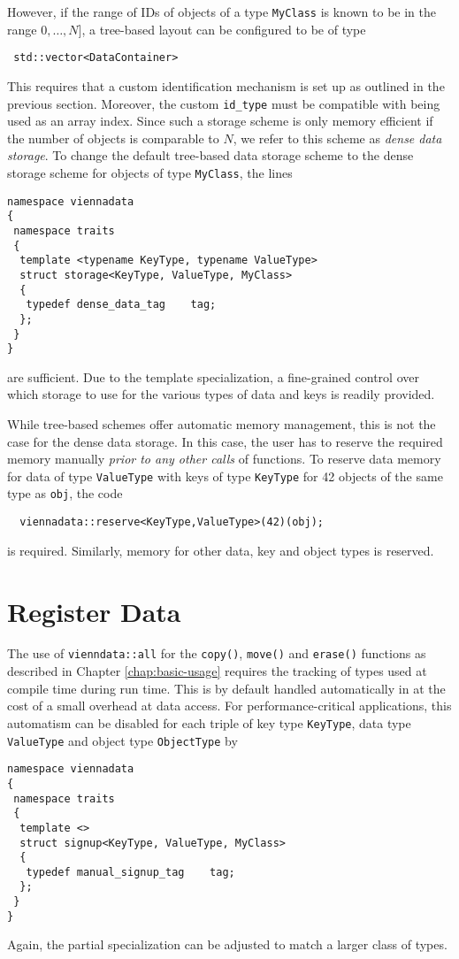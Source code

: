However, if the range of IDs of objects of a type \lstinline|MyClass| is known to be in the range $0, \ldots, N]$,
a tree-based layout can be configured to be of type
\begin{lstlisting}
 std::vector<DataContainer>
\end{lstlisting}
This requires that a custom identification mechanism is set up as outlined in the previous section. Moreover, the 
custom \lstinline|id_type| must be compatible with being used as an array index. Since such a storage scheme is only memory efficient
if the number of objects is comparable to $N$, we refer to this scheme as \emph{dense data storage}.
To change the default tree-based data storage scheme to the dense storage scheme for objects of type \lstinline|MyClass|, the lines
\begin{lstlisting}
namespace viennadata
{
 namespace traits
 {
  template <typename KeyType, typename ValueType>
  struct storage<KeyType, ValueType, MyClass>
  {
   typedef dense_data_tag    tag;
  };
 }
}
\end{lstlisting}
are sufficient. Due to the template specialization, a fine-grained control over which storage to use for the various types of data and keys is readily provided.

While tree-based schemes offer automatic memory management, this is not the case for the dense data storage. In this case, 
the user has to reserve the required memory manually \emph{prior to any other calls} of {\ViennaData} functions.
To reserve data memory for data of type \lstinline|ValueType| with keys of type \lstinline|KeyType| for 42 objects of the same type as \lstinline|obj|,
the code
\begin{lstlisting}
  viennadata::reserve<KeyType,ValueType>(42)(obj);
\end{lstlisting}
is required. Similarly, memory for other data, key and object types is reserved.


\section{Register Data} \label{sec:register-data}
The use of \lstinline|vienndata::all| for the \lstinline|copy()|, \lstinline|move()| and \lstinline|erase()| functions as described in Chapter \ref{chap:basic-usage}
requires the tracking of types used at compile time during run time. This is by default handled automatically in {\ViennaData} at the cost of a small overhead at data access.
For performance-critical applications, this automatism can be disabled for each triple of key type \lstinline|KeyType|, data type \lstinline|ValueType| and object type \lstinline|ObjectType| by
\begin{lstlisting}
namespace viennadata
{
 namespace traits
 {
  template <>
  struct signup<KeyType, ValueType, MyClass>
  {
   typedef manual_signup_tag    tag;
  };
 }
}
\end{lstlisting}
Again, the partial specialization can be adjusted to match a larger class of types.

